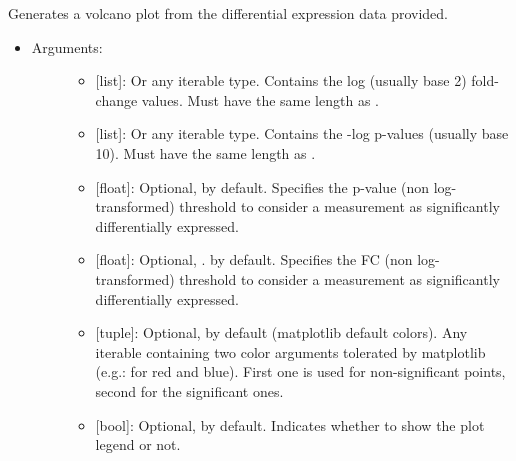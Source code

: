 \documentclass[letterpaper,10pt,english]{sphinxmanual}
\begin{document}

\begin{fulllineitems}
\label{\detokenize{plots:data_tools.plots.volcano}}
Generates a volcano plot from the differential expression data
provided.
\begin{itemize}
\item {} \begin{description}
\item[{Arguments:}] \leavevmode\begin{itemize}
\item {} 
 {[}list{]}: Or any iterable type. Contains the log
(usually base 2) fold-change values. Must have the same length
as .

\item {} 
 {[}list{]}: Or any iterable type. Contains the -log
p-values (usually base 10). Must have the same length as
.

\item {} 
 {[}float{]}: Optional,  by default. Specifies
the p-value (non log-transformed) threshold to consider a
measurement as significantly differentially expressed.

\item {} 
 {[}float{]}: Optional, . by default. Specifies the
FC (non log-transformed) threshold to consider a measurement
as significantly differentially expressed.

\item {} 
 {[}tuple{]}: Optional,  by default (matplotlib
default colors). Any iterable containing two color arguments
tolerated by matplotlib (e.g.: \sphinxcode{\sphinxupquote{{[}'r', 'b'{]}}} for red and
blue). First one is used for non-significant points, second
for the significant ones.

\item {} 
 {[}bool{]}: Optional,  by default. Indicates
whether to show the plot legend or not.


\end{itemize}
\end{description}
\end{itemize}
\end{fulllineitems}
\end{document}
